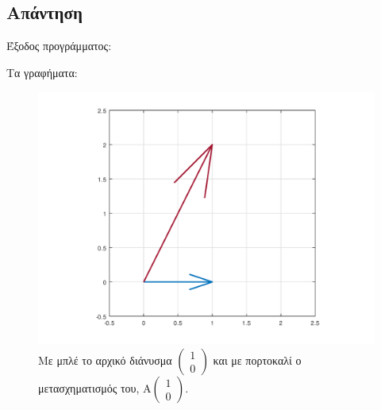 \documentclass[a4paper,12pt]{article}
\begin{document}
\subsection{Απάντηση}
Έξοδος προγράμματος:

Τα γραφήματα:
\begin{figure}
    \centering
    \includegraphics[scale=0.6]{x1.png}
    \caption{Με μπλέ το αρχικό διάνυσμα
    $
        \begin{pmatrix}
            1 \\
            0
        \end{pmatrix}
    $
    και με πορτοκαλί ο μετασχηματισμός του,
    $
        \text{A} \begin{pmatrix}
            1 \\
            0
        \end{pmatrix}
    $.}
\end{figure}
\end{document}
